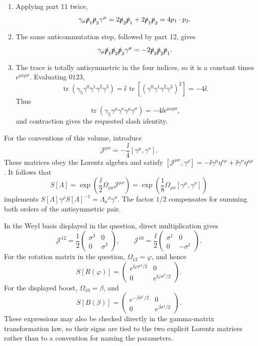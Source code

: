\begin{enumerate}
\begin{enumerate}
\[
 \gamma_\mu\slashed p\gamma^\mu
 =2p_\mu\gamma^\mu-\slashed p\,\gamma_\mu\gamma^\mu
 =2\slashed p-4\slashed p=-2\slashed p.
\]
\item
Applying part 11 twice,
\[
 \gamma_\mu\slashed p_1\slashed p_2\gamma^\mu
 =2\slashed p_2\slashed p_1
 +2\slashed p_1\slashed p_2
 =4p_1\cdot p_2.
\]
\item
The same anticommutation step, followed by part 12, gives
\[
 \gamma_\mu\slashed p_1\slashed p_2\slashed p_3\gamma^\mu
 =-2\slashed p_3\slashed p_2\slashed p_1.
\]
\item
The trace is totally antisymmetric in the four indices, so it is a
constant times \(\epsilon^{\mu\nu\rho\sigma}\).  Evaluating \(0123\),
\[
 \operatorname{tr}(\gamma_5\gamma^0\gamma^1\gamma^2\gamma^3)
 =\ii\,\operatorname{tr}
 [(\gamma^0\gamma^1\gamma^2\gamma^3)^2]
 =-4\ii.
\]
Thus
\[
 \operatorname{tr}(\gamma_5\gamma^\mu\gamma^\nu\gamma^\rho\gamma^\sigma)
 =-4\ii\epsilon^{\mu\nu\rho\sigma},
\]
and contraction gives the requested slash identity.
\end{enumerate}

For the conventions of this volume, introduce
\[
 \mathcal J^{\mu\nu}=-\frac{\ii}{4}[\gamma^\mu,\gamma^\nu].
\]
These matrices obey the Lorentz algebra and satisfy
\([\mathcal J^{\mu\nu},\gamma^\rho]
=-\ii\gamma^\mu\eta^{\nu\rho}+\ii\gamma^\nu\eta^{\mu\rho}\).
It follows that
\[
 \boxed{
 S[\Lambda]
 =\exp\!\left(\frac{\ii}{2}\Omega_{\mu\nu}
 \mathcal J^{\mu\nu}\right)
 =\exp\!\left(\frac18\Omega_{\mu\nu}
 [\gamma^\mu,\gamma^\nu]\right) }
\]
implements
\(S[\Lambda]\gamma^\rho S[\Lambda]^{-1}
=\Lambda_\sigma{}^\rho\gamma^\sigma\).  The factor \(1/2\) compensates
for summing both orders of the antisymmetric pair.

In the Weyl basis displayed in the question, direct multiplication gives
\[
 \mathcal J^{12}
 =\frac12\begin{pmatrix}\sigma^3&0\\0&\sigma^3\end{pmatrix},
 \qquad
 \mathcal J^{10}
 =\frac{\ii}{2}\begin{pmatrix}\sigma^1&0\\0&-\sigma^1\end{pmatrix}.
\]
For the rotation matrix in the question, \(\Omega_{12}=\varphi\), and
hence
\[
 \boxed{
 S[R(\varphi)]
 =\begin{pmatrix}
 e^{\ii\varphi\sigma^3/2}&0\\
 0&e^{\ii\varphi\sigma^3/2}
 \end{pmatrix}. }
\]
For the displayed boost, \(\Omega_{10}=\beta\), and
\[
 \boxed{
 S[B(\beta)]
 =\begin{pmatrix}
 e^{-\beta\sigma^1/2}&0\\
 0&e^{\beta\sigma^1/2}
 \end{pmatrix}. }
\]
These expressions may also be checked directly in the gamma-matrix
transformation law, so their signs are tied to the two explicit Lorentz
matrices rather than to a convention for naming the parameters.


\end{enumerate}
